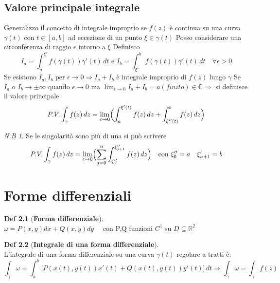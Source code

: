 \documentclass[a4paper,11pt]{report}
\theoremstyle{remark}
\newtheorem*{nb}{N.B}
\theoremstyle{definition}
\newtheorem*{Def}{Def}
\begin{document}
\section{Valore principale integrale}
	Generalizzo il concetto di integrale improprio \newline
	se $f(z)$ è continua su una curva $\gamma(t)$ con $t\in [a,b]$ ad eccezione di un punto $\xi \in \gamma(t)$ \newline
	Posso considerare una circonferenza di raggio $\epsilon$ intorno a $\xi$ \newline
	Definisco 
	\begin{equation*}
		I_a = \int_{a}^{\xi'} f(\gamma(t))\gamma'(t)\,dt \text{ e } I_b = \int_{\xi''}^{b} f(\gamma(t))\gamma'(t)\,dt \quad \forall \epsilon>0	
	\end{equation*}
	Se esistono $I_a, I_b \mbox{ per } \epsilon\to 0 \Rightarrow I_a + I_b$ è integrale improprio di $f(z)$ lungo $\gamma$ \newline
	Se $I_a \mbox{ o } I_b \to\pm\infty \mbox{ quando } \epsilon \to 0 \mbox{ ma } \displaystyle \lim_{\epsilon\to 0} I_a + I_b = a (finito) \in \mathbb{C}
	\Rightarrow$ si definisce il valore principale 
	\begin{equation*}
		P.V. \int_\gamma f(z)\,dz = \lim_{\epsilon \to 0} \Bigl(\int_{a}^{\xi'(t)} f(z)\,dz + \int_{\xi''(t)}^{b} f(z)\,dz\Bigr)
	\end{equation*}

	\begin{nb}
		Se le singolarità sono più di una si può scrivere
		\begin{equation*}
			P.V. \int_\gamma f(z)\,dz =\lim_{\epsilon \to 0} \Bigl(\sum_{j=0}^{n} \int_{\xi''_j}^{\xi''_{j+1}} f(z)\,dz\Bigr) \quad \text{con } \xi''_0=a \quad \xi'_{n+1}=b
		\end{equation*} 
	\end{nb}
 
\chapter{Forme differenziali}
	\begin{Def}[\textbf{Forma differenziale}]\hfil\\
		$\omega = P(x,y)dx + Q(x,y)dy \quad$ con P,Q funzioni $C^1 \mbox{ su } D \subseteq \mathbb{R}^2$
	\end{Def}

	\begin{Def}[\textbf{Integrale di una forma differenziale}]\hfil\\
		L'integrale di una forma differenziale su una curva $\gamma(t)$ regolare a tratti è:
		\begin{equation*}
			\int_\gamma \omega = \int_{a}^{b} \bigl[P(x(t),y(t))x'(t)+Q(x(t),y(t))y'(t)\bigr]\,dt \Rightarrow \int_\gamma \omega = \int_\gamma f(z)
		\end{equation*} 
	\end{Def}
	
\end{document}
